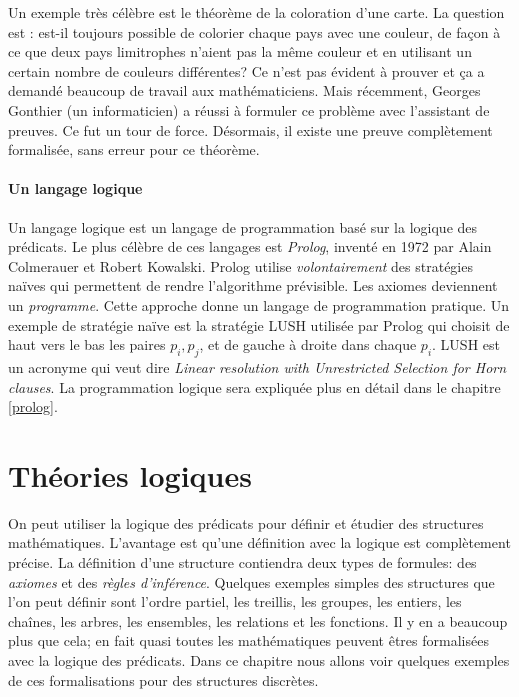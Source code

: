 {Un exemple très célèbre est le théorème de la coloration d'une carte. La question est : est-il toujours possible de colorier chaque pays avec une couleur, de façon à ce que deux pays limitrophes n'aient pas la même couleur et en utilisant un certain nombre de couleurs différentes? Ce n'est pas évident à prouver et ça a demandé beaucoup de travail aux mathématiciens. Mais récemment, Georges Gonthier (un informaticien) a réussi à formuler ce problème avec l'assistant de preuves. Ce fut un tour de force. Désormais, il existe une preuve complètement formalisée, sans erreur pour ce théorème.

\subsubsection{Un langage logique}

Un langage logique est un langage de programmation basé sur la logique des prédicats.
Le plus célèbre de ces langages est {\em Prolog}, inventé en 1972 par Alain Colmerauer et Robert Kowalski.
Prolog utilise {\em volontairement} des stratégies naïves qui permettent de rendre l'algorithme prévisible.
Les axiomes deviennent un {\em programme}.
Cette approche donne un langage de programmation pratique.
Un exemple de stratégie naïve est la stratégie LUSH utilisée par Prolog
qui choisit de haut vers le bas les paires $p_i, p_j$,
et de gauche à droite dans chaque $p_i$.
LUSH est un acronyme qui veut dire {\em Linear resolution with Unrestricted Selection for Horn clauses}.
La programmation logique sera expliquée plus en détail dans le chapitre \ref{prolog}.


\chapter{Théories logiques}

On peut utiliser la logique des prédicats pour définir et étudier des structures mathématiques.
L'avantage est qu'une définition avec la logique est complètement précise.
La définition d'une structure contiendra deux types de formules:
des {\em axiomes} et des {\em règles d'inférence}.
Quelques exemples simples des structures que l'on peut définir sont
l'ordre partiel, les treillis, les groupes, les entiers, les chaînes, les arbres,
les ensembles, les relations et les fonctions.
Il y en a beaucoup plus que cela; en fait quasi toutes les mathématiques
peuvent êtres formalisées avec la logique des prédicats.
Dans ce chapitre nous allons voir quelques exemples de ces formalisations
pour des structures discrètes.

}
